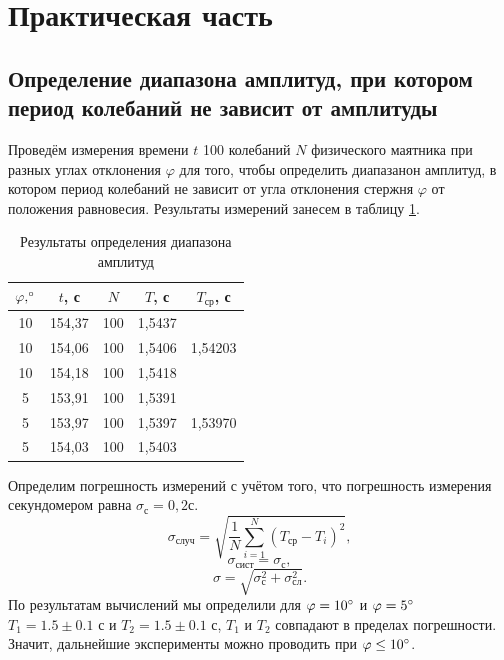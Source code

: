 \documentclass{article}
\begin{document}
\section{Практическая часть}

\subsection*{Определение диапазона амплитуд, при котором период колебаний не зависит от амплитуды}
Проведём измерения времени \(t\) 100 колебаний \(N\) физического маятника при разных углах отклонения \(\varphi\) для того, чтобы определить диапазанон амплитуд, в котором период колебаний не зависит от угла отклонения стержня \(\varphi\) от положения равновесия.  Результаты измерений занесем в таблицу \ref{tab1}.
\begin{table}[h!]
\centering
\begin{tabular}{|c|c|c|c|c|} \hline
	\(\varphi, \degree\) & \(t\), с & \(N\) & \(T\), с   & $ T_\text{ср} $, с \\ \hline
10  & 154,37                & 100                   & 1,5437                &                       \\
10  & 154,06                & 100                   & 1,5406                & 1,54203                 \\
10  & 154,18                & 100                   & 1,5418                &                       \\ \hline
5   & 153,91                & 100                   & 1,5391                &                       \\
5   & 153,97                & 100                   & 1,5397                & 1,53970                 \\
5   & 154,03                & 100                   & 1,5403                &             \\       
\hline    
\end{tabular} 
\caption{Результаты определения диапазона амплитуд}
\label{tab1}
\end{table}

Определим погрешность измерений с учётом того, что погрешность измерения секундомером равна \(\sigma_\text{с} = 0,2 \text{с}\).
\[
\sigma_\text{случ} = \sqrt{\frac{1}{N}\sum_{i=1}^{N}\left( T_\text{ср} - T_i \right)^2 },
\]
\[
\sigma_\text{сист} = \sigma_\text{с},
\]
\[
\sigma = \sqrt{\sigma_\text{с}^2+\sigma_\text{сл}^2}.
\]
По результатам вычислений мы определили для \(\varphi = 10\degree\) и \(\varphi = 5\degree\) \(T_\text{1} = 1.5 \pm 0.1 \text{ с}\) и \(T_\text{2} = 1.5 \pm 0.1 \text{ с}\), \(T_\text{1}\) и \(T_\text{2}\) совпадают в пределах погрешности. Значит, дальнейшие эксперименты можно проводить при \(\varphi \leq 10\degree\).
\end{document}
